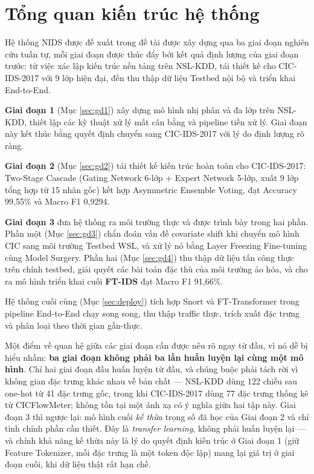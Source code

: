 \documentclass[../DoAn.tex]{subfiles}
\begin{document}
\section{Tổng quan kiến trúc hệ thống}
\label{sec:tq-kientruc}

Hệ thống NIDS được đề xuất trong đề tài được xây dựng qua ba giai đoạn nghiên cứu tuần tự, mỗi giai đoạn được thúc đẩy bởi kết quả định lượng của giai đoạn trước: từ việc xác lập kiến trúc nền tảng trên NSL-KDD, tái thiết kế cho CIC-IDS-2017 với 9 lớp hiện đại, đến thu thập dữ liệu Testbed nội bộ và triển khai End-to-End.

\textbf{Giai đoạn 1} (Mục \ref{sec:gd1}) xây dựng mô hình nhị phân và đa lớp trên NSL-KDD, thiết lập các kỹ thuật xử lý mất cân bằng và pipeline tiền xử lý. Giai đoạn này kết thúc bằng quyết định chuyển sang CIC-IDS-2017 với lý do định lượng rõ ràng.

\textbf{Giai đoạn 2} (Mục \ref{sec:gd2}) tái thiết kế kiến trúc hoàn toàn cho CIC-IDS-2017: Two-Stage Cascade (Gating Network 6-lớp + Expert Network 5-lớp, xuất 9 lớp tổng hợp từ 15 nhãn gốc) kết hợp Asymmetric Ensemble Voting, đạt Accuracy 99,55\% và Macro F1 0,9294.

\textbf{Giai đoạn 3} đưa hệ thống ra môi trường thực và được trình bày trong hai phần. Phần một (Mục \ref{sec:gd3}) chẩn đoán vấn đề covariate shift khi chuyển mô hình CIC sang môi trường Testbed WSL, và xử lý nó bằng Layer Freezing Fine-tuning cùng Model Surgery. Phần hai (Mục \ref{sec:gd4}) thu thập dữ liệu tấn công thực trên chính testbed, giải quyết các bài toán đặc thù của môi trường ảo hóa, và cho ra mô hình triển khai cuối \textbf{FT-IDS} đạt Macro F1 91,66\%.

Hệ thống cuối cùng (Mục \ref{sec:deploy}) tích hợp Snort và FT-Transformer trong pipeline End-to-End chạy song song, thu thập traffic thực, trích xuất đặc trưng và phân loại theo thời gian gần-thực.

Một điểm về quan hệ giữa các giai đoạn cần được nêu rõ ngay từ đầu, vì nó dễ bị hiểu nhầm: \textbf{ba giai đoạn không phải ba lần huấn luyện lại cùng một mô hình}. Chỉ hai giai đoạn đầu huấn luyện từ đầu, và chúng buộc phải tách rời vì không gian đặc trưng khác nhau về bản chất --- NSL-KDD dùng 122 chiều sau one-hot từ 41 đặc trưng gốc, trong khi CIC-IDS-2017 dùng 77 đặc trưng thống kê từ CICFlowMeter; không tồn tại một ánh xạ có ý nghĩa giữa hai tập này. Giai đoạn 3 thì ngược lại: mô hình cuối \textit{kế thừa} trọng số đã học của Giai đoạn 2 và chỉ tinh chỉnh phần cần thiết. Đây là \textit{transfer learning}, không phải huấn luyện lại --- và chính khả năng kế thừa này là lý do quyết định kiến trúc ở Giai đoạn 1 (giữ Feature Tokenizer, mỗi đặc trưng là một token độc lập) mang lại giá trị ở giai đoạn cuối, khi dữ liệu thật rất hạn chế.
\end{document}
